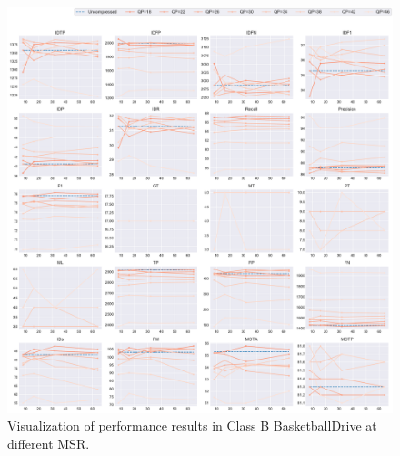 \begin{figure}[!htbp]
\centering
\includegraphics[width=1.0\linewidth]{img/appendix/BasketballDrive_all_multiplots_msr.pdf}
\caption[Visualization of performance results in Class B BasketballDrive at different MSR]
{Visualization of performance results in Class B BasketballDrive at different MSR.}
\label{fig:BasketballDrive_all_msr}
\end{figure}



